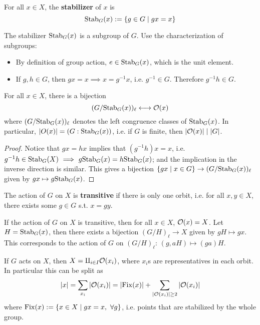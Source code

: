 \documentclass{article}
\begin{document}
\begin{definition}[Stabilizer]
    For all $x \in X$, the \textbf{stabilizer} of $x$ is
    \[
        \mathrm{Stab}_G(x) := \{g \in G \mid gx = x\}
    \]
\end{definition}

\begin{remark}
    The stabilizer $\mathrm{Stab}_G(x)$ is a subgroup of $G$. Use the characterization of subgroups:
    \begin{itemize}
        \item By definition of group action, $e \in \mathrm{Stab}_G(x)$, which is the unit element.
        \item If $g, h \in G$, then $gx = x \implies x = g^{-1}x$, i.e. $g^{-1} \in G$. Therefore $g^{-1}h \in G$. 
    \end{itemize}
\end{remark}

\begin{lemma}
    For all $x \in X$, there is a bijection
    \[
        (G / \mathrm{Stab}_G(x))_{\ell} \longleftrightarrow \mathcal{O}(x)
    \]
    where $(G / \mathrm{Stab}_G(x))_{\ell}$ denotes the left congruence classes of $\mathrm{Stab}_G(x)$. In particular, $\left|O(x)\right| = (G : \mathrm{Stab}_G(x))$, i.e. if $G$ is finite, then $\left|\mathcal{O}(x)\right| \mid \left|G\right|$.
\end{lemma}

\begin{proof}
    Notice that $gx = hx$ implies that $(g^{-1}h)x = x$, i.e. $g^{-1}h \in \mathrm{Stab}_G(X) \ \Longrightarrow\  g \mathrm{Stab}_G(x) = h \mathrm{Stab}_G(x)$; and the implication in the inverse direction is similar. This gives a bijection $\{ gx \mid x \in G \} \to (G / \mathrm{Stab}_G(x))_{\ell}$ given by $gx \mapsto g \mathrm{Stab}_G(x)$.
\end{proof}

\begin{definition}[Transitive]
    The action of $G$ on $X$ is \textbf{transitive} if there is only one orbit, i.e. for all $x, y \in X$, there exists some $g \in G$ s.t. $x = gy$.
\end{definition}

\begin{corollary}
    If the action of $G$ on $X$ is transitive, then for all $x \in X$, $\mathcal{O}(x) = X$. Let $H = \mathrm{Stab}_G(x)$, then there exists a bijection $(G/H)_{\ell} \to X$ given by $gH \mapsto gx$. This corresponds to the action of $G$ on $(G/H)_{\ell}$: $(g, aH) \mapsto (ga)H$.
\end{corollary}

\begin{remark}
    If $G$ acts on $X$, then $X = \amalg_{i \in I} \mathcal{O}(x_i)$, where $x_i$s are representatives in each orbit. In particular this can be split as
    \[
        \left|x\right| = \sum_{x_i} \left|\mathcal{O}(x_i)\right| = \left|\mathrm{Fix}(x)\right| + \sum_{\left|\mathcal{O}(x_i)\right| \geq 2} \left|\mathcal{O}(x_i)\right|
    \]
    where $\mathrm{Fix}(x) := \{ x \in X \mid gx = x,\ \forall g \}$, i.e. points that are stabilized by the whole group.
\end{remark}
\end{document}
